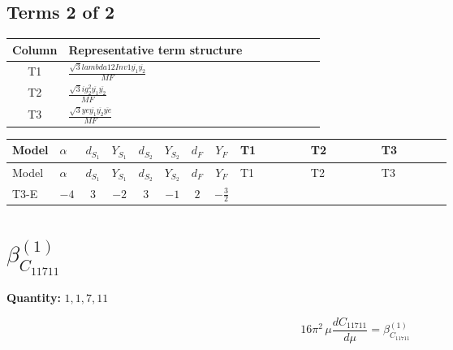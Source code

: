 \documentclass[8pt]{article}
\begin{document}
\begin{landscape}
\subsection*{Terms 2 of 2}
\begin{center}
\begin{tabular}{@{}c >{\raggedright\arraybackslash}p{0.82\linewidth}@{}}
\toprule
Column & Representative term structure \\
\midrule
T1 & \(\displaystyle \frac{\sqrt{3} lambda12Inv1 \overline{y_{1}} \overline{y_{2}}}{MF}\) \\
\midrule
T2 & \(\displaystyle \frac{\sqrt{3} i g_{2}^{2} \overline{y_{1}} \overline{y_{2}}}{MF}\) \\
\midrule
T3 & \(\displaystyle \frac{\sqrt{3} ye \overline{y_{1}} \overline{y_{2}} \overline{ye}}{MF}\) \\
\midrule
\bottomrule
\end{tabular}
\end{center}
\smallskip
\tiny
\begin{longtable}{@{}llcccccc >{\raggedright\arraybackslash}p{0.21\linewidth} >{\raggedright\arraybackslash}p{0.21\linewidth} >{\raggedright\arraybackslash}p{0.21\linewidth}@{}}
\toprule
Model & $\alpha$ & $d_{S_1}$ & $Y_{S_1}$ & $d_{S_2}$ & $Y_{S_2}$ & $d_F$ & $Y_F$ & T1 & T2 & T3 \\
\midrule
\endfirsthead
\toprule
Model & $\alpha$ & $d_{S_1}$ & $Y_{S_1}$ & $d_{S_2}$ & $Y_{S_2}$ & $d_F$ & $Y_F$ & T1 & T2 & T3 \\
\midrule
\endhead
T3-E & $-4$ & $3$ & $-2$ & $3$ & $-1$ & $2$ & $-\frac{3}{2}$ & \scriptsize\adjustbox{max width=\linewidth}{$\begin{gathered} \frac{\sqrt{3} lambda12Inv1 \overline{y_{1}} \overline{y_{2}}}{6 MF}\end{gathered}$} & \scriptsize\adjustbox{max width=\linewidth}{$\begin{gathered} - \frac{\sqrt{3} i g_{2}^{2} \overline{y_{1}} \overline{y_{2}}}{6 MF}\end{gathered}$} & \scriptsize\adjustbox{max width=\linewidth}{$\begin{gathered} \frac{\sqrt{3} ye \overline{y_{1}} \overline{y_{2}} \overline{ye}}{12 MF}\end{gathered}$} \\
\midrule
\bottomrule
\end{longtable}
\clearpage
\section*{$\beta_{C_{11711}}^{(1)}$}
\noindent\textbf{Quantity: }$\mathrm{1,1,7,11}$\par\smallskip
\[16\pi^2\,\mu\frac{d C_{11711}}{d\mu}=\beta_{C_{11711}}^{(1)}\]

\end{landscape}
\end{document}
